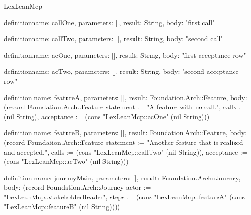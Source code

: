 \begin{lexlean}{LexLeanMcp}
\begin{semanticmodule}
definition{name: callOne, parameters: [], result: String, body: "first call"}

definition{name: callTwo, parameters: [], result: String, body: "second call"}

definition{name: acOne, parameters: [], result: String, body: "first acceptance row"}

definition{name: acTwo, parameters: [], result: String, body: "second acceptance row"}

definition{
  name: featureA,
  parameters: [],
  result: Foundation.Arch::Feature,
  body: (record Foundation.Arch::Feature {statement := "A feature with no call.", calls := (nil String), acceptance := (cons "LexLeanMcp::acOne" (nil String))})
}

definition{
  name: featureB,
  parameters: [],
  result: Foundation.Arch::Feature,
  body: (record Foundation.Arch::Feature {statement := "Another feature that is realized and accepted.", calls := (cons "LexLeanMcp::callTwo" (nil String)), acceptance := (cons "LexLeanMcp::acTwo" (nil String))})
}

definition{
  name: journeyMain,
  parameters: [],
  result: Foundation.Arch::Journey,
  body: (record Foundation.Arch::Journey {actor := "LexLeanMcp::stakeholderReader", steps := (cons "LexLeanMcp::featureA" (cons "LexLeanMcp::featureB" (nil String)))})
}
\end{semanticmodule}
\end{lexlean}
